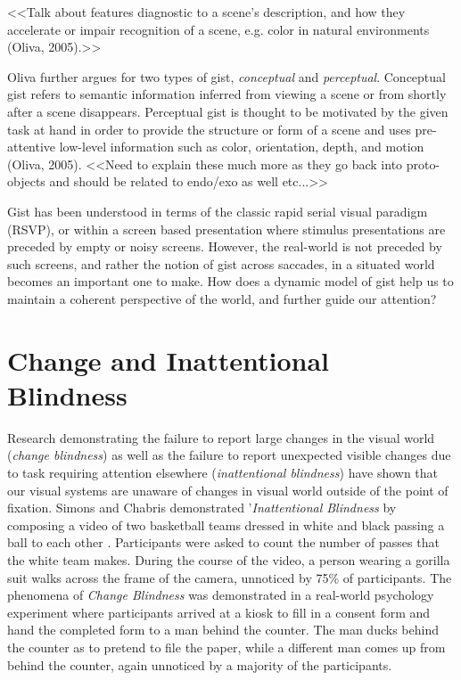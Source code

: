 \documentclass[a4paper,11pt,final]{ThesisStyle}
\begin{document}
<<Talk about features diagnostic to a scene's description, and how they accelerate or impair recognition of a scene, e.g. color in natural environments (Oliva, 2005).>>

Oliva further argues for two types of gist, \textit{conceptual} and \textit{perceptual}.  Conceptual gist refers to semantic information inferred from viewing a scene or from shortly after a scene disappears. Perceptual gist is thought to be motivated by the given task at hand in order to provide the structure or form of a scene and uses pre-attentive low-level information such as color, orientation, depth, and motion (Oliva, 2005).  <<Need to explain these much more as they go back into proto-objects and should be related to endo/exo as well etc...>>
	
Gist has been understood in terms of the classic rapid serial visual paradigm (RSVP), or within a screen based presentation where stimulus presentations are preceded by empty or noisy screens.  However, the real-world is not preceded by such screens, and rather the notion of gist across saccades, in a situated world becomes an important one to make.  How does a dynamic model of gist help us to maintain a coherent perspective of the world, and further guide our attention?  

\section{Change and Inattentional Blindness}

Research demonstrating the failure to report large changes in the visual world (\textit{change blindness}) as well as the failure to report unexpected visible changes due to task requiring attention elsewhere (\textit{inattentional blindness}) \cite{Simons1999,Rensink2000,Rensink2001,Hollingworth2001a} have shown that our visual systems are unaware of changes in visual world outside of the point of fixation.  Simons and Chabris demonstrated '\textit{Inattentional Blindness} by composing a video of two basketball teams dressed in white and black passing a ball to each other \cite{Simons1999}.  Participants were asked to count the number of passes that the white team makes.  During the course of the video, a person wearing a gorilla suit walks across the frame of the camera, unnoticed by 75\% of participants.  The phenomena of \textit{Change Blindness} was demonstrated in a real-world psychology experiment \cite{Simons1998} where participants arrived at a kiosk to fill in a consent form and hand the completed form to a man behind the counter.  The man ducks behind the counter as to pretend to file the paper, while a different man comes up from behind the counter, again unnoticed by a majority of the participants.  
\end{document}
